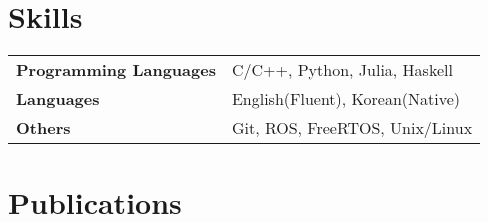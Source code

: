 \documentclass[letterpaper,9pt]{article}
\begin{document}

{\selectfont
\section{Skills}
}
\vspace{-2.5mm}
\begin{tabularx}{\linewidth}{@{}l X@{}}
\textbf{Programming Languages} &  \normalsize{C/C++, Python, Julia, Haskell}\\
\textbf{Languages}  &  \normalsize{English(Fluent), Korean(Native)}\\
\textbf{Others}  &  \normalsize{Git, ROS, FreeRTOS, Unix/Linux}\\
\end{tabularx}

{\selectfont
\section{Publications}
}
\vspace{-2mm}
\begin{refsection}
\nocite{*}
\printbibliography[heading=none]
\end{refsection}

\vfill
{}
\end{document}
